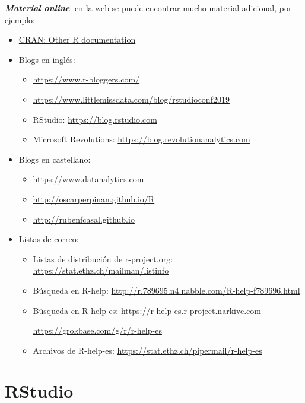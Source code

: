 \documentclass[]{book}
\begin{document}
\textbf{\emph{Material online}}: en la web se puede encontrar mucho
material adicional, por ejemplo:

\begin{itemize}
\item
  \href{https://www.r-project.org/other-docs.html}{CRAN: Other R
  documentation}
\item
  Blogs en inglés:

  \begin{itemize}
  \item
    \url{https://www.r-bloggers.com/}
  \item
    \url{https://www.littlemissdata.com/blog/rstudioconf2019}
  \item
    RStudio: \url{https://blog.rstudio.com}
  \item
    Microsoft Revolutions: \url{https://blog.revolutionanalytics.com}
  \end{itemize}
\item
  Blogs en castellano:

  \begin{itemize}
  \item
    \url{https://www.datanalytics.com}
  \item
    \url{http://oscarperpinan.github.io/R}
  \item
    \url{http://rubenfcasal.github.io}
  \end{itemize}
\item
  Listas de correo:

  \begin{itemize}
  \item
    Listas de distribución de r-project.org:
    \url{https://stat.ethz.ch/mailman/listinfo}
  \item
    Búsqueda en R-help:
    \url{http://r.789695.n4.nabble.com/R-help-f789696.html}
  \item
    Búsqueda en R-help-es: \url{https://r-help-es.r-project.narkive.com}

    \url{https://grokbase.com/g/r/r-help-es}
  \item
    Archivos de R-help-es:
    \url{https://stat.ethz.ch/pipermail/r-help-es}
  \end{itemize}
\end{itemize}

\section{RStudio}\label{rstudio-links}
\end{document}
